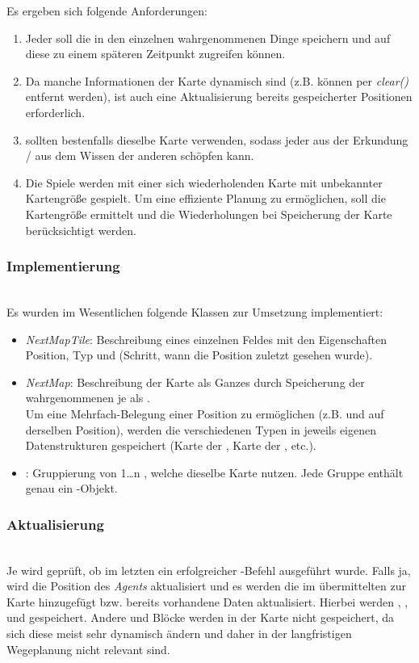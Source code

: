 Es ergeben sich folgende Anforderungen:
\begin{enumerate}
	\item Jeder \Agent soll die in den einzelnen \Steps wahrgenommenen Dinge speichern und auf diese zu einem späteren Zeitpunkt zugreifen können. 
	\item Da manche Informationen der Karte dynamisch sind (z.B. können \Obstacles per \textit{clear()} entfernt werden), ist auch eine Aktualisierung bereits gespeicherter Positionen erforderlich. 
	\item \Agents sollten bestenfalls dieselbe Karte verwenden, sodass jeder \Agent aus der Erkundung / aus dem Wissen der anderen \Agents schöpfen kann.
	\item Die Spiele werden mit einer sich wiederholenden Karte mit unbekannter Kartengröße gespielt. Um eine effiziente Planung zu ermöglichen, soll die Kartengröße ermittelt und die Wiederholungen bei Speicherung der Karte berücksichtigt werden.
\end{enumerate}

\subsubsection{Implementierung} ~\\
Es wurden im Wesentlichen folgende Klassen zur Umsetzung implementiert:
\begin{itemize}
	\item \textit{NextMapTile}: Beschreibung eines einzelnen Feldes mit den Eigenschaften Position, Typ und \Step (Schritt, wann die Position zuletzt gesehen wurde).   
	\item \textit{NextMap}: Beschreibung der Karte als Ganzes durch Speicherung der wahrgenommenen \Things je \Step als \NextMapTiles. \\ Um eine Mehrfach-Belegung einer Position zu ermöglichen (z.B. \GoalZone und \Obstacle auf derselben Position), werden die verschiedenen Typen in jeweils eigenen Datenstrukturen gespeichert (Karte der \Obstacles, Karte der \GoalZones, etc.).
	\item \textit{\NextGroup}: Gruppierung von 1…n \Agents, welche dieselbe Karte nutzen. Jede Gruppe enthält genau ein \NextMap-Objekt. 
\end{itemize}

\subsubsection{Aktualisierung} ~\\
Je \Agent wird geprüft, ob im letzten \Step ein erfolgreicher \move-Befehl ausgeführt wurde. Falls ja, wird die Position des \textit{Agents} aktualisiert und es werden die im \Percept übermittelten \Things zur Karte hinzugefügt bzw. bereits vorhandene Daten aktualisiert. Hierbei werden \Dispenser, \GoalZones, \RoleZones und \Obstacles gespeichert. Andere \Agents und Blöcke werden in der Karte nicht gespeichert, da sich diese meist sehr dynamisch ändern und daher in der langfristigen Wegeplanung nicht relevant sind.

